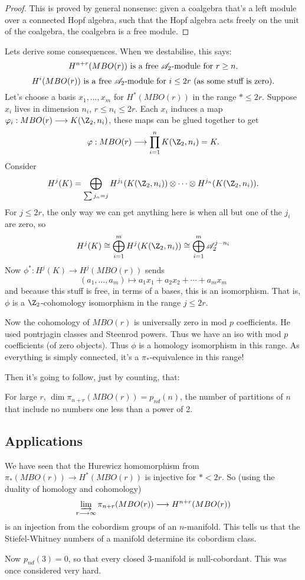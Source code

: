 \documentclass[11pt]{article}
\begin{document}
\begin{JeremyThomPracticeTalk}
\begin{proof}
\noindent This is proved by general nonsense:  given a coalgebra that's a left module over a connected Hopf algebra, such that the Hopf algebra acts freely on the unit of the coalgebra, the coalgebra is a free module.
\end{proof}
Lets derive some consequences. When we destabilise, this says:
\[H^{n+r}(MBO(r))\text{ is a free $\Steen$-module for $r\geq n$.}\]
\[H^{i}(MBO(r))\text{ is a free $\Steen$-module for $i\leq 2r$ (as some stuff is zero).}\]
Let's choose a basis $x_1,\ldots,x_m$ for $H^*(MBO(r))$ in the range $*\leq 2r$.
Suppose $x_i$ lives in dimension $n_i$, $r\leq n_i\leq 2r$. Each $x_i$ induces a map $\phi_i:MBO(r)\to K(\Z_2,n_i)$, these maps can be glued together to get
\[\phi:MBO(r)\to \prod_{i=1}^n K(\Z_2,n_i)=K.\]
Consider
\[ H^j(K)=\bigoplus_{\sum j_\alpha=j}H^{j_1}(K(\Z_2,n_i))\otimes\cdots\otimes H^{j_n}(K(\Z_2,n_i)).\]
For $j\leq 2r$, the only way we can get anything here is when all but one of the $j_i$ are zero, so
\[H^j(K)\cong \bigoplus_{i=1}^m H^j(K(\Z_2,n_i))\cong \bigoplus_{i=1}^m \Steen^{j-n_i}\]
Now $\phi^*:H^j(K)\to H^j(MBO(r))$ sends
\[(a_1,\ldots,a_m)\mapsto a_1x_1+ a_2x_2+ \cdots+ a_mx_m\]
and because this stuff is free, in terms of a bases, this is an isomorphism. That is, $\phi$ is a $\Z_2$-cohomology isomorphism in the range $j\leq 2r$.

Now the cohomology of $MBO(r)$ is universally zero in mod $p$ coefficients. He used pontrjagin classes and Steenrod powers. Thus we have an iso with mod $p$ coefficients (of zero objects). Thus $\phi$ is a homology isomorphism in this range. As everything is simply connected, it's a $\pi_*$-equivalence in this range!

Then it's going to follow, just by counting, that:
\begin{cor*}
For large $r$, $\dim \pi_{n+r}(MBO(r))=p_{nd}(n)$, the number of partitions of $n$ that include no numbers one less than a power of 2.
\end{cor*}
\subsection*{Applications}
We have seen that the Hurewicz homomorphism from $\pi_*(MBO(r))\to H^*(MBO(r))$ is injective for $\ast< 2r$. So (using the duality of homology and cohomology)
\[\varinjlim_{r\to\infty} \pi_{n+r}(MBO(r))\to H^{n+r}(MBO(r))\]
is an injection from the cobordism groups of an $n$-manifold. This tells us that the Stiefel-Whitney numbers of a manifold determine its cobordism class.

Now $p_{nd}(3)=0$, so that every closed $3$-manifold is null-cobordant. This was once considered very hard.

\pagebreak
\end{JeremyThomPracticeTalk}
\end{document}
